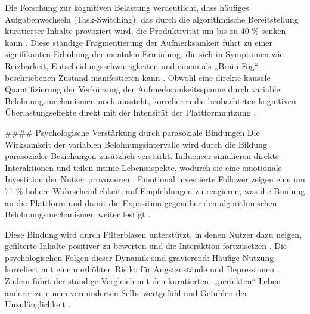 \documentclass[11pt,a4paper]{article}
\begin{document}
Die Forschung zur kognitiven Belastung verdeutlicht, dass häufiges Aufgabenwechseln (Task-Switching), das durch die algorithmische Bereitstellung kuratierter Inhalte provoziert wird, die Produktivität um bis zu 40 \% senken kann \autocite{grey_grey_d4bc9c0d0e8441ba90398520e73af07d,grey_grey_b52a063f344f4bb6bb0b07a772233fbf}. Diese ständige Fragmentierung der Aufmerksamkeit führt zu einer signifikanten Erhöhung der mentalen Ermüdung, die sich in Symptomen wie Reizbarkeit, Entscheidungsschwierigkeiten und einem als „Brain Fog“ beschriebenen Zustand manifestieren kann \autocite{grey_grey_d4bc9c0d0e8441ba90398520e73af07d}. Obwohl eine direkte kausale Quantifizierung der Verkürzung der Aufmerksamkeitsspanne durch variable Belohnungsmechanismen noch aussteht, korrelieren die beobachteten kognitiven Überlastungseffekte direkt mit der Intensität der Plattformnutzung \autocite{grey_grey_d4bc9c0d0e8441ba90398520e73af07d,grey_grey_3467cac0f11d4b1e86319128da218a3e}.

\#\#\#\# Psychologische Verstärkung durch parasoziale Bindungen Die Wirksamkeit der variablen Belohnungsintervalle wird durch die Bildung parasozialer Beziehungen zusätzlich verstärkt. Influencer simulieren direkte Interaktionen und teilen intime Lebensaspekte, wodurch sie eine emotionale Investition der Nutzer provozieren \autocite{grey_grey_5d5c282590c448fc8776b04f78a08de5}. Emotional investierte Follower zeigen eine um 71 \% höhere Wahrscheinlichkeit, auf Empfehlungen zu reagieren, was die Bindung an die Plattform und damit die Exposition gegenüber den algorithmischen Belohnungsmechanismen weiter festigt \autocite{grey_grey_5d5c282590c448fc8776b04f78a08de5}.

Diese Bindung wird durch Filterblasen unterstützt, in denen Nutzer dazu neigen, gefilterte Inhalte positiver zu bewerten und die Interaktion fortzusetzen \autocite{grey_grey_bbc8a51d8734471c850e8c2939fe8d32}. Die psychologischen Folgen dieser Dynamik sind gravierend: Häufige Nutzung korreliert mit einem erhöhten Risiko für Angstzustände und Depressionen \autocite{grey_grey_3467cac0f11d4b1e86319128da218a3e}. Zudem führt der ständige Vergleich mit den kuratierten, „perfekten“ Leben anderer zu einem verminderten Selbstwertgefühl und Gefühlen der Unzulänglichkeit \autocite{grey_grey_3467cac0f11d4b1e86319128da218a3e,grey_grey_f99abd6bfbd04efc8def60bb6988ce35,grey_grey_8407dc6841b0415a989fd351e0065df0}.
\end{document}
